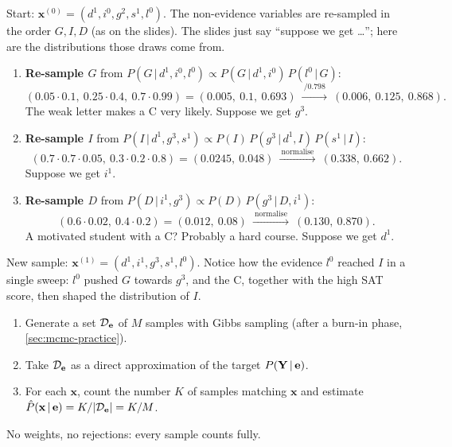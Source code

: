 \documentclass[11pt, oneside]{book}
\newcommand{\Prob}{\mathbb{P}}           %
\newcommand{\dataset}{\mathcal{D}}       %
\newcommand{\given}{\,\vert\,}           %
\newcommand{\bx}{\mathbf{x}}  \newcommand{\by}{\mathbf{y}}
\begin{document}
\begin{exbox}[title={One full Gibbs iteration for $P(I \given s^1, l^0)$, with real numbers}]
Start: $\bx^{(0)} = (d^1, i^0, g^2, s^1, l^0)$. The non-evidence variables are
re-sampled in the order $G, I, D$ (as on the slides). The slides just say
``suppose we get \ldots''; here are the distributions those draws come from.
\begin{enumerate}
  \item \textbf{Re-sample $G$} from $P(G \given d^1, i^0, l^0) \propto
    P(G \given d^1, i^0)\, P(l^0 \given G)$:
    \[
    (0.05 \cdot 0.1,\ 0.25 \cdot 0.4,\ 0.7 \cdot 0.99) = (0.005,\ 0.1,\ 0.693)
    \ \xrightarrow{\ /0.798\ }\ (0.006,\ 0.125,\ 0.868).
    \]
    The weak letter makes a C very likely. Suppose we get $g^3$.
  \item \textbf{Re-sample $I$} from $P(I \given d^1, g^3, s^1) \propto
    P(I)\, P(g^3 \given d^1, I)\, P(s^1 \given I)$:
    \[
    (0.7 \cdot 0.7 \cdot 0.05,\ 0.3 \cdot 0.2 \cdot 0.8) = (0.0245,\ 0.048)
    \ \xrightarrow{\ \text{normalise}\ }\ (0.338,\ 0.662).
    \]
    Suppose we get $i^1$.
  \item \textbf{Re-sample $D$} from $P(D \given i^1, g^3) \propto P(D)\,
    P(g^3 \given D, i^1)$:
    \[
    (0.6 \cdot 0.02,\ 0.4 \cdot 0.2) = (0.012,\ 0.08)
    \ \xrightarrow{\ \text{normalise}\ }\ (0.130,\ 0.870).
    \]
    A motivated student with a C? Probably a hard course. Suppose we get $d^1$.
\end{enumerate}
New sample: $\bx^{(1)} = (d^1, i^1, g^3, s^1, l^0)$. Notice how the
evidence $l^0$ reached $I$ in a single sweep: $l^0$ pushed $G$ towards $g^3$,
and the C, together with the high SAT score, then shaped the distribution of
$I$.
\end{exbox}

\begin{thmbox}[title={Probabilistic inference with Gibbs sampling}, unbreakable]
\begin{enumerate}
  \item Generate a set $\dataset_{\be}$ of $M$ samples with Gibbs sampling
    (after a burn-in phase, \cref{sec:mcmc-practice}).
  \item Take $\dataset_{\be}$ as a direct approximation of the target
    $P(\bY \given \be)$.
  \item For each $\bx$, count the number $K$ of samples matching $\bx$ and
    estimate $\hat P(\bx \given \be) = K / |\dataset_{\be}| = K/M$.
\end{enumerate}
No weights, no rejections: every sample counts fully.
\end{thmbox}
\end{document}
